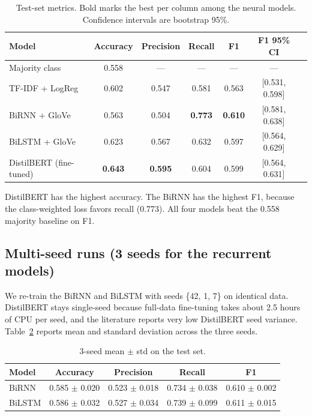 \documentclass{article}
\begin{document}
\begin{table}[h]
\centering
\caption{Test-set metrics. Bold marks the best per column among the neural models. Confidence intervals are bootstrap 95\%.}
\label{tab:overall}
\begin{tabular}{lcccccl}
\toprule
Model & Accuracy & Precision & Recall & F1 & F1 95\% CI \\
\midrule
Majority class             & 0.558 & --- & --- & --- & --- \\
TF-IDF + LogReg          & 0.602 & 0.547 & 0.581 & 0.563 & [0.531, 0.598] \\
BiRNN + GloVe             & 0.563 & 0.504 & \textbf{0.773} & \textbf{0.610} & [0.581, 0.638] \\
BiLSTM + GloVe            & 0.623 & 0.567 & 0.632 & 0.597 & [0.564, 0.629] \\
DistilBERT (fine-tuned)   & \textbf{0.643} & \textbf{0.595} & 0.604 & 0.599 & [0.564, 0.631] \\
\bottomrule
\end{tabular}
\end{table}

DistilBERT has the highest accuracy. The BiRNN has the highest F1, because the class-weighted loss favors recall (0.773). All four models beat the 0.558 majority baseline on F1.

\subsection{Multi-seed runs (3 seeds for the recurrent models)}
We re-train the BiRNN and BiLSTM with seeds \{42, 1, 7\} on identical data. DistilBERT stays single-seed because full-data fine-tuning takes about 2.5 hours of CPU per seed, and the literature reports very low DistilBERT seed variance. Table~\ref{tab:multiseed} reports mean and standard deviation across the three seeds.

\begin{table}[h]
\centering
\caption{3-seed mean $\pm$ std on the test set.}
\label{tab:multiseed}
\begin{tabular}{lcccc}
\toprule
Model & Accuracy & Precision & Recall & F1 \\
\midrule
BiRNN  & 0.585 $\pm$ 0.020 & 0.523 $\pm$ 0.018 & 0.734 $\pm$ 0.038 & 0.610 $\pm$ 0.002 \\
BiLSTM & 0.586 $\pm$ 0.032 & 0.527 $\pm$ 0.034 & 0.739 $\pm$ 0.099 & 0.611 $\pm$ 0.015 \\
\bottomrule
\end{tabular}
\end{table}
\end{document}
